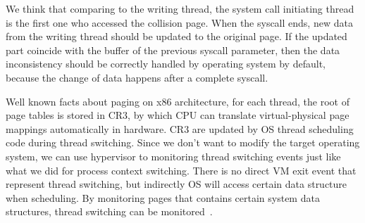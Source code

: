 We think that comparing to the writing thread, the system call initiating thread is the first one who accessed the collision page. When the syscall ends, new data from the writing thread should be updated to the original page. If the updated part coincide with the buffer of the previous syscall parameter, then the data inconsistency should be correctly handled by operating system by default, because the change of data happens after a complete syscall.

Well known facts about paging on x86 architecture, for each thread, the root of page tables is stored in CR3, by which CPU can translate virtual-physical page mappings automatically in hardware. CR3 are updated by OS thread scheduling code during thread switching. Since we don't want to modify the target operating system, we can use hypervisor to monitoring thread switching events just like what we did for process context switching. There is no direct VM exit event that represent thread switching, but indirectly OS will access certain data structure when scheduling. By monitoring pages that contains certain system data structures, thread switching can be monitored~\cite{pan2017digtool}.


